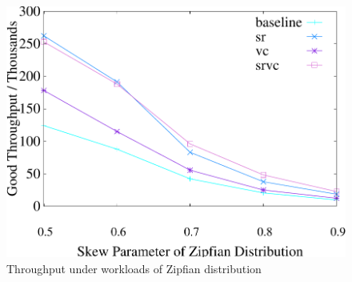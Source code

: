 \begin{figure}[t]
	\begin{minipage}[b]{0.32\linewidth}
	\centering
	\includegraphics[width=\textwidth]{./exp_fig/basic/tps}
	\vspace{-2em}
	\caption{Throughput under workloads of Zipfian distribution}
	\label{fig:basic:tps}
	\end{minipage}    
    \vspace{-1em}
\end{figure}

